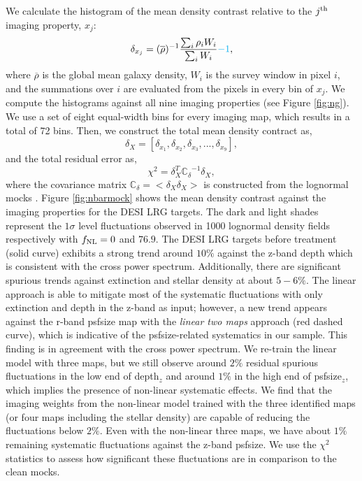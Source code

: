 We calculate the histogram of the mean density contrast relative to the $j^{\rm th}$ imaging property, $x_{j}$:
\begin{equation}
\delta_{x_{j}} = ({\overline{\rho}})^{-1} \frac{\sum_{i} \rho_{i} W_{i}}{\sum_{i} W_{i}} \textcolor{cyan}{- 1},
\end{equation}
where $\overline{\rho}$ is the global mean galaxy density, $W_{i}$ is the survey window in pixel $i$, and the summations over $i$ are evaluated from the pixels in every bin of $x_{j}$. We compute the histograms against all nine imaging properties (see Figure \ref{fig:ng}). We use a set of eight equal-width bins for every imaging map, which results in a total of 72 bins. Then, we construct the total mean density contract as,
\begin{equation}
\delta_{X} = [\delta_{x_{1}}, \delta_{x_{2}}, \delta_{x_{3}}, ..., \delta_{x_{9}}],
\end{equation}
and the total residual error as,
\begin{equation}
\chi^{2} = \delta_{X}^{T} \mathbb{C_{\delta}}^{-1} \delta_{X},
\end{equation}
where the covariance matrix $\mathbb{C}_{\delta} = < \delta_{X} \delta_{X}>$ is constructed from the lognormal mocks . Figure \ref{fig:nbarmock} shows the mean density contrast against the imaging properties for the DESI LRG targets. The dark and light shades represent the $1\sigma$ level fluctuations observed in 1000 lognormal density fields respectively with $f_{\rm NL}=0$ and $76.9$. The DESI LRG targets before treatment (solid curve) exhibits a strong trend around $10\%$ against the z-band depth which is consistent with the cross power spectrum. Additionally, there are significant spurious trends against extinction and stellar density at about $5-6\%$. The linear approach is able to mitigate most of the systematic fluctuations with only extinction and depth in the z-band as input; however, a new trend appears against the r-band psfsize map with the \textit{linear two maps} approach (red dashed curve), which is indicative of the psfsize-related systematics in our sample. This finding is in agreement with the cross power spectrum. We re-train the linear model with three maps, but we still observe around $2\%$ residual spurious fluctuations in the low end of depth$_{z}$ and around $1\%$ in the high end of psfsize$_{z}$, which implies the presence of non-linear systematic effects. We find that the imaging weights from the non-linear model trained with the three identified maps (or four maps including the stellar density) are capable of reducing the fluctuations below $2\%$. Even with the non-linear three maps, we have about $1\%$ remaining systematic fluctuations against the z-band psfsize. We use the $\chi^{2}$ statistics to assess how significant these fluctuations are in comparison to the clean mocks. 

